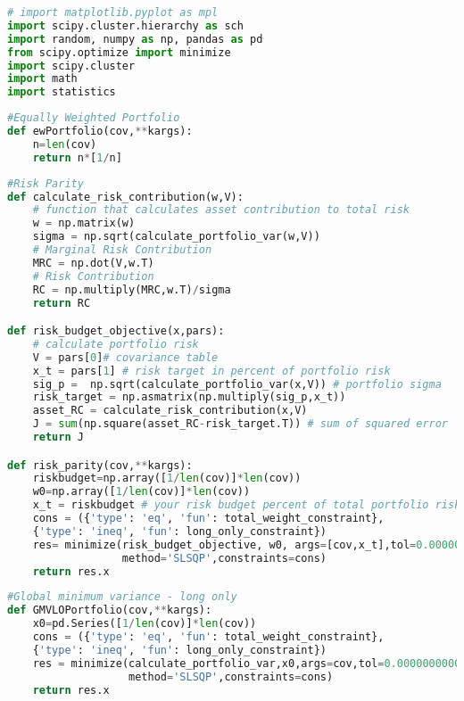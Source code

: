 \begin{lstlisting}[language=Python]
# import matplotlib.pyplot as mpl
import scipy.cluster.hierarchy as sch
import random, numpy as np, pandas as pd
from scipy.optimize import minimize
import scipy.cluster
import math
import statistics
\end{lstlisting}

\begin{lstlisting}[language=Python]
#Equally Weighted Portfolio
def ewPortfolio(cov,**kargs):
    n=len(cov)
    return n*[1/n]
\end{lstlisting}

\begin{lstlisting}[language=Python]
#Risk Parity
def calculate_risk_contribution(w,V):
    # function that calculates asset contribution to total risk
    w = np.matrix(w)
    sigma = np.sqrt(calculate_portfolio_var(w,V))
    # Marginal Risk Contribution
    MRC = np.dot(V,w.T)
    # Risk Contribution
    RC = np.multiply(MRC,w.T)/sigma
    return RC

def risk_budget_objective(x,pars):
    # calculate portfolio risk
    V = pars[0]# covariance table
    x_t = pars[1] # risk target in percent of portfolio risk
    sig_p =  np.sqrt(calculate_portfolio_var(x,V)) # portfolio sigma
    risk_target = np.asmatrix(np.multiply(sig_p,x_t))
    asset_RC = calculate_risk_contribution(x,V)
    J = sum(np.square(asset_RC-risk_target.T)) # sum of squared error
    return J

def risk_parity(cov,**kargs):
    riskbudget=np.array([1/len(cov)]*len(cov))
    w0=np.array([1/len(cov)]*len(cov))
    x_t = riskbudget # your risk budget percent of total portfolio risk (equal risk)
    cons = ({'type': 'eq', 'fun': total_weight_constraint},
    {'type': 'ineq', 'fun': long_only_constraint})
    res= minimize(risk_budget_objective, w0, args=[cov,x_t],tol=0.000000000000001,
                  method='SLSQP',constraints=cons) 
    return res.x
\end{lstlisting}

\begin{lstlisting}[language=Python]
#Global minimum variance - long only
def GMVLOPortfolio(cov,**kargs):
    x0=pd.Series([1/len(cov)]*len(cov))
    cons = ({'type': 'eq', 'fun': total_weight_constraint},
    {'type': 'ineq', 'fun': long_only_constraint})
    res = minimize(calculate_portfolio_var,x0,args=cov,tol=0.000000000000001,
                   method='SLSQP',constraints=cons)
    return res.x
\end{lstlisting}

